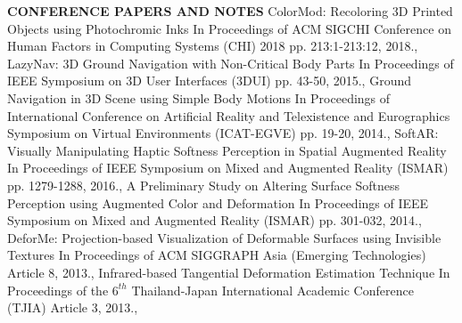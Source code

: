 \documentclass[11pt]{article} %
\begin{document}
\textbf{CONFERENCE PAPERS AND NOTES}
\publicationthelist
{
	{ColorMod: Recoloring 3D Printed Objects using Photochromic Inks}
	{In Proceedings of ACM SIGCHI Conference on Human Factors in Computing Systems (CHI) 2018}
	{pp. 213:1-213:12,}
	{2018.},
	{LazyNav: 3D Ground Navigation with Non-Critical Body Parts}
	{In Proceedings of IEEE Symposium on 3D User Interfaces (3DUI)}
	{pp. 43-50,}
	{2015.},
	{Ground Navigation in 3D Scene using Simple Body Motions}
	{In Proceedings of International Conference on Artificial Reality and Telexistence and Eurographics Symposium on Virtual Environments (ICAT-EGVE)}
	{pp. 19-20,}
	{2014.},
	{SoftAR: Visually Manipulating Haptic Softness Perception in Spatial Augmented Reality}
	{In Proceedings of IEEE Symposium on Mixed and Augmented Reality (ISMAR)}
	{pp. 1279-1288,}
	{2016.},
	{A Preliminary Study on Altering Surface Softness Perception using Augmented Color and Deformation}
	{In Proceedings of IEEE Symposium on Mixed and Augmented Reality (ISMAR)}
	{pp. 301-032,}
	{2014.},
	{DeforMe: Projection-based Visualization of Deformable Surfaces using Invisible Textures}
	{In Proceedings of ACM SIGGRAPH Asia (Emerging Technologies)}
	{Article 8,}
	{2013.},
	{Infrared-based Tangential Deformation Estimation Technique}
	{In Proceedings of the $6^{th}$ Thailand-Japan International Academic Conference (TJIA)}
	{Article 3,}
	{2013.},
}

\end{document}
